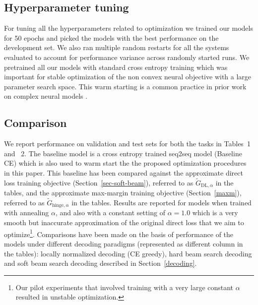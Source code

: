 \documentclass[letterpaper]{article} %
\begin{document}
\subsection{Hyperparameter tuning}
For tuning all the hyperparameters related to optimization we trained our models for 50 epochs and picked the models with the best performance on the development set. We also ran multiple random restarts for all the systems evaluated to account for performance variance across randomly started runs. We pretrained all our models with standard cross entropy training which was important for stable optimization of the non convex neural objective with a large parameter search space. This warm starting is a common practice in prior work on complex neural models \cite{ranzato2015sequence,rush2015neural,bengioss}. 


\subsection{Comparison}
We report performance on validation and test sets for both the tasks in Tables~1 and ~2. The baseline model is a cross entropy trained seq2seq model (Baseline CE) which is also used to warm start the the proposed optimization procedures in this paper. This baseline has been compared against the approximate direct loss training objective (Section~\ref{sec-soft-beam}), referred to as $\tilde{G}_{\textrm{DL},\alpha}$ in the tables, and the approximate max-margin training objective (Section~\ref{maxm}), referred to as $\tilde{G}_{\textrm{hinge},\alpha}$ in the tables. Results are reported for models when trained with annealing $\alpha$, and also with a constant setting of $\alpha=1.0$ which is a very smooth but inaccurate approximation of the original direct loss that we aim to optimize\footnote{Our pilot experiments that involved training with a very large constant $\alpha$ resulted in unstable optimization.}. Comparisons have been made on the basis of performance of the models under different decoding paradigms (represented as different column in the tables): locally normalized decoding (CE greedy), hard beam search decoding and soft beam search decoding described in Section~\ref{decoding}.
\end{document}
